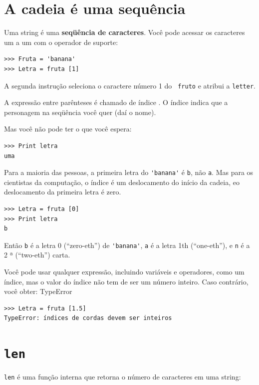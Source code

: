 \documentclass[10pt]{book}
\begin{document}
\begin{exercise}
{\section{A cadeia é uma sequência}

Uma string é uma {\bf seqüência de caracteres}.  
Você pode acessar os caracteres um a um com o
operador de suporte:

\begin{verbatim}
>>> Fruta = 'banana'
>>> Letra = fruta [1]
\end{verbatim}
%
A segunda instrução seleciona o caractere número 1 do {\tt
fruto} e atribui a {\tt letter}.  

A expressão entre parênteses é chamado de índice {\bf}.  
O índice indica que a personagem na seqüência você
quer (daí o nome).

Mas você não pode ter o que você espera:

\begin{verbatim}
>>> Print letra
uma
\end{verbatim}
%
Para a maioria das pessoas, a primeira letra do \verb "'banana'" é {\tt b}, não
{\tt a}. Mas para os cientistas da computação, o índice é um deslocamento do
início da cadeia, eo deslocamento da primeira letra é zero.

\begin{verbatim}
>>> Letra = fruta [0]
>>> Print letra
b
\end{verbatim}
%
Então {\tt b} é a letra 0 (``zero-eth'') de \verb "'banana'", {\tt a}
é a letra 1th (``one-eth''), e {\tt n} é a 2 ª (``two-eth'')
carta.

Você pode usar qualquer expressão, incluindo variáveis ​​e operadores, como um
índice, mas o valor do índice não tem de ser um número inteiro. Caso contrário, você
obter:
\index{} TypeError

\begin{verbatim}
>>> Letra = fruta [1.5]
TypeError: índices de cordas devem ser inteiros
\end{verbatim}
%

\section{{\tt len}}

{\tt len} é uma função interna que retorna o número de caracteres
em uma string:

}
\end{exercise}
\end{document}
